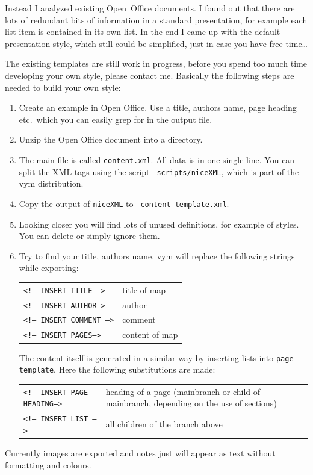 \documentclass[12pt,a4paper]{article}
\newcommand{\vym}{{\sc vym }}
\begin{document}
\begin{appendix}
Instead I analyzed existing Open~Office documents. I found out that
there are lots of redundant bits of information in a standard
presentation, for example each list item is contained in its own list.
In the end I came up with the default presentation style, which still
could be simplified, just in case you have free time\ldots

The existing templates are still work in progress, before you spend too
much time developing your own style, please contact me.  Basically the
following steps are needed to build your own style:
\begin{enumerate}
	\item Create an example in Open Office. Use a title, authors name,
	page heading etc.\ which you can easily grep for in the output file.
	
	\item Unzip  the Open Office document into a directory.

	\item The main file is called {\tt content.xml}. All data is in one
	single line. You can split the XML tags using the script {\tt
	scripts/niceXML}, which is part of the \vym distribution.

	\item Copy the output of {\tt niceXML} to {\tt
	content-template.xml}.

	\item Looking closer you will find lots of unused definitions, for
	example of styles. You can delete or simply ignore them.

	\item Try to find your title, authors name. \vym will replace the
	following strings while exporting:
	\begin{center}
	\begin{tabular}{lp{4cm}}
		{\tt <!-- INSERT TITLE -->}		& title of map \\
		{\tt <!-- INSERT AUTHOR-->	}	& author \\
		{\tt <!-- INSERT COMMENT -->}	& comment \\
		{\tt <!-- INSERT PAGES-->}		& content of map \\
	\end{tabular}
	\end{center}
	The content itself is generated in a similar way by inserting lists
	into {\tt page-template}. Here the following substitutions are made:
	\begin{center}
	\begin{tabular}{lp{7cm}}
		{\tt <!-- INSERT PAGE HEADING-->}		& heading of a page
		(mainbranch or child of mainbranch, depending on the use of
		sections) \\
		{\tt <!-- INSERT LIST -->	}	& all children of the branch above \\
	\end{tabular}
	\end{center}
\end{enumerate}
Currently images are exported and notes just will appear as text
without formatting and colours.





\end{appendix}
\end{document}
